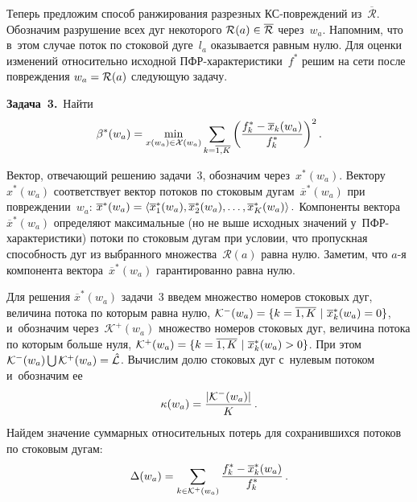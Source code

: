 \begin{multicols}{2}
\vspace*{-2pt}

Теперь предложим способ ранжирования разрезных КС-по\-вреж\-де\-ний 
из~$\overline{\mathcal{R}}$. Обозначим разрушение всех дуг 
некоторого $\mathcal{R}(a)\hm\in\overline{\mathcal{R}}$ через~$w_a$. 
Напомним, что в~этом случае поток по стоковой дуге~$l_a$ оказывается равным нулю.
Для оценки изменений относительно исходной ПФР-ха\-рак\-те\-ри\-сти\-ки~$ f^{*}$ 
решим на сети после по\-вреж\-де\-ния $w_a\hm= \mathcal{R}(a)$ сле\-ду\-ющую задачу.

\smallskip

\noindent
\textbf{Задача~3.}\ Найти
$$
 \beta^{*}(w_a) = \min\limits_{{x}(w_a) \in {\mathcal{X}(w_a)}} 
 \sum\limits_{k = \overline{1, K}} \left( \displaystyle\frac{\displaystyle f_k^* - \overline{x}_k(w_a)\mathstrut}{\displaystyle f_k^*\mathstrut} \right)^2. 
 $$

Вектор, отвечающий решению задачи~3, обозначим через~${x}^*(w_a)$. 
Вектору~${x}^*(w_a)$ соответствует вектор потоков по стоковым 
дугам~$\overline{{x}}^*(w_a)$ при по\-вреж\-де\-нии~$w_a$: 
$ \overline{{x}}^*(w_a)\hm =  \left\langle \overline{x}_1^*(w_a), 
\overline{x}_2^*(w_a), \ldots, \overline{x}_K^*(w_a)  \right\rangle.$
Компоненты вектора~$\overline{{x}}^*(w_a)$ определяют максимальные (но не 
выше исходных значений у~ПФР-ха\-рак\-те\-ри\-сти\-ки) 
потоки по стоковым дугам при условии, что пропускная способность дуг из 
выбранного множества~$\mathcal{R}(a)$ равна нулю. Заметим, что $a$-я компонента 
вектора~$\overline{{x}}^*(w_a)$ гарантированно равна нулю.




Для решения $\overline{{x}}^*(w_a)$ задачи~3 введем множество номеров 
стоковых дуг, величина потока по которым равна нулю,
$\mathcal{K}^-(w_a) \hm= \{ k = \overline{1, K} \  | \ \overline{x}_k^*(w_a) \hm= 0\}$, 
и~обозначим через~$\mathcal{K}^+(w_a)$ множество номеров стоковых дуг, 
величина потока по которым больше нуля,
$\mathcal{K}^+(w_a) \hm= \{ k = \overline{1, K}\  | \ \overline{x}_k^*(w_a) \hm> 0\} $.
При этом
$ \mathcal{K}^-(w_a) \hm\bigcup \mathcal{K}^+(w_a)\hm = \hat{\mathcal{L}}$.
Вычислим долю стоковых дуг с~нулевым потоком и~обозначим ее
$$
\kappa(w_a) \hm= \fr{|\mathcal{K}^-(w_a)|}{K}\,.
$$
Найдем  значение суммарных относительных потерь для сохранившихся потоков 
по стоковым дугам:
$$
\Delta (w_a)= \sum\limits_{k\in\mathcal{K}^+(w_a)}
\displaystyle\frac{\displaystyle f_k^* - \overline {x}_k^*(w_a)\mathstrut}{\displaystyle f_k^*\mathstrut}\,.  
$$


\end{multicols}
